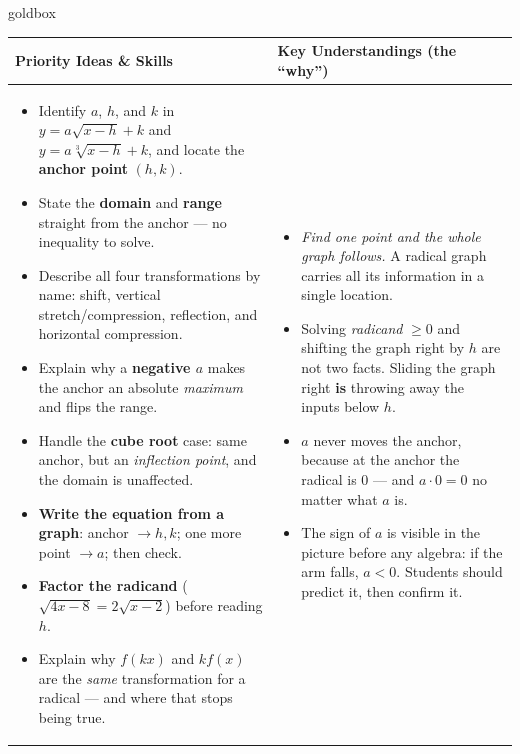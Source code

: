 \documentclass[10pt]{article}
\begin{document}
\renewcommand{\arraystretch}{1.4}
\begin{skillbox}{goldbox}
\begin{tabularx}{\linewidth}{@{}X|X@{}}
\textbf{Priority Ideas \& Skills} & \textbf{Key Understandings (the ``why'')} \\[2pt]
\hline
\vspace{-6pt}
\begin{itemize}[leftmargin=1.1em, nosep, after=\vspace{2pt}]
  \item Identify $a$, $h$, and $k$ in $y=a\sqrt{x-h}+k$ and $y=a\sqrt[3]{x-h}+k$, and locate the \textbf{anchor point} $(h,k)$.
  \item State the \textbf{domain} and \textbf{range} straight from the anchor --- no inequality to solve.
  \item Describe all four transformations by name: shift, vertical stretch/compression, reflection, and horizontal compression.
  \item Explain why a \textbf{negative $a$} makes the anchor an absolute \emph{maximum} and flips the range.
  \item Handle the \textbf{cube root} case: same anchor, but an \emph{inflection point}, and the domain is unaffected.
  \item \textbf{Write the equation from a graph}: anchor $\rightarrow h,k$; one more point $\rightarrow a$; then check.
  \item \textbf{Factor the radicand} ($\sqrt{4x-8}=2\sqrt{x-2}$) before reading $h$.
  \item Explain why $f(kx)$ and $kf(x)$ are the \emph{same} transformation for a radical --- and where that stops being true.
\end{itemize}
&
\vspace{-6pt}
\begin{itemize}[leftmargin=1.1em, nosep, after=\vspace{2pt}]
  \item \emph{Find one point and the whole graph follows.} A radical graph carries all its information in a single location.
  \item Solving \emph{radicand} $\ge0$ and shifting the graph right by $h$ are not two facts. Sliding the graph right \textbf{is} throwing away the inputs below $h$.
  \item $a$ never moves the anchor, because at the anchor the radical is $0$ --- and $a\cdot 0=0$ no matter what $a$ is.
  \item The sign of $a$ is visible in the picture before any algebra: if the arm falls, $a<0$. Students should predict it, then confirm it.

\end{itemize}
\end{tabularx}
\end{skillbox}
\end{document}
